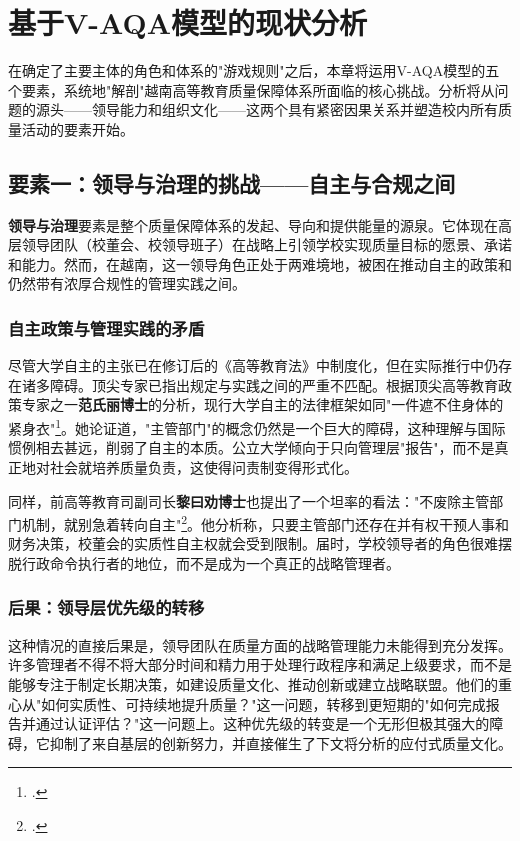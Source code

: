 



\section{基于V-AQA模型的现状分析}
\label{sec:phan_tich_vqa}

在确定了主要主体的角色和体系的"游戏规则"之后，本章将运用V-AQA模型的五个要素，系统地"解剖"越南高等教育质量保障体系所面临的核心挑战。分析将从问题的源头——领导能力和组织文化——这两个具有紧密因果关系并塑造校内所有质量活动的要素开始。

\subsection{要素一：领导与治理的挑战——自主与合规之间}
\label{subsec:thach_thuc_lanhdao}

\textbf{领导与治理}要素是整个质量保障体系的发起、导向和提供能量的源泉。它体现在高层领导团队（校董会、校领导班子）在战略上引领学校实现质量目标的愿景、承诺和能力。然而，在越南，这一领导角色正处于两难境地，被困在推动自主的政策和仍然带有浓厚合规性的管理实践之间。

\subsubsection{自主政策与管理实践的矛盾}
尽管大学自主的主张已在修订后的《高等教育法》中制度化，但在实际推行中仍存在诸多障碍。顶尖专家已指出规定与实践之间的严重不匹配。根据顶尖高等教育政策专家之一\textbf{范氏丽博士}的分析，现行大学自主的法律框架如同"一件遮不住身体的紧身衣"\footcite{lypham_aosat_2024}。她论证道，"主管部门"的概念仍然是一个巨大的障碍，这种理解与国际惯例相去甚远，削弱了自主的本质。公立大学倾向于只向管理层"报告"，而不是真正地对社会就培养质量负责，这使得问责制变得形式化。

同样，前高等教育司副司长\textbf{黎曰劝博士}也提出了一个坦率的看法："不废除主管部门机制，就别急着转向自主"\footcite{khuyen_bochuquan_2022}。他分析称，只要主管部门还存在并有权干预人事和财务决策，校董会的实质性自主权就会受到限制。届时，学校领导者的角色很难摆脱行政命令执行者的地位，而不是成为一个真正的战略管理者。

\subsubsection{后果：领导层优先级的转移}
这种情况的直接后果是，领导团队在质量方面的战略管理能力未能得到充分发挥。许多管理者不得不将大部分时间和精力用于处理行政程序和满足上级要求，而不是能够专注于制定长期决策，如建设质量文化、推动创新或建立战略联盟。他们的重心从"如何实质性、可持续地提升质量？"这一问题，转移到更短期的"如何完成报告并通过认证评估？"这一问题上。这种优先级的转变是一个无形但极其强大的障碍，它抑制了来自基层的创新努力，并直接催生了下文将分析的应付式质量文化。

